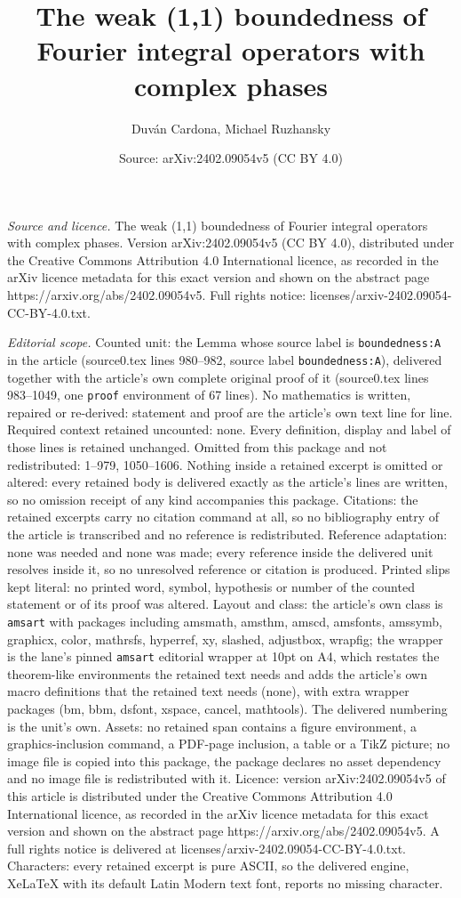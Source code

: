 \documentclass[10pt,a4paper]{amsart}
\title[The weak (1,1) boundedness of Fourier integral operators wit]{The weak (1,1) boundedness of Fourier integral operators with complex phases}
\author{Duv\'an Cardona, Michael Ruzhansky}
\date{Source: arXiv:2402.09054v5 (CC BY 4.0)}
\begin{document}
\maketitle

\noindent\emph{Source and licence.} The weak (1,1) boundedness of Fourier integral operators with complex phases. Version arXiv:2402.09054v5 (CC BY 4.0), distributed under the Creative Commons Attribution 4.0 International licence, as recorded in the arXiv licence metadata for this exact version and shown on the abstract page https://arxiv.org/abs/2402.09054v5. Full rights notice: licenses/arxiv-2402.09054-CC-BY-4.0.txt.\par\smallskip

\noindent\textit{Editorial scope.} Counted unit: the Lemma whose source label is \texttt{boundedness:A} in the article (source0.tex lines 980--982, source label \texttt{boundedness:A}), delivered together with the article's own complete original proof of it (source0.tex lines 983--1049, one \texttt{proof} environment of 67 lines). No mathematics is written, repaired or re-derived: statement and proof are the article's own text line for line. Required context retained uncounted: none. Every definition, display and label of those lines is retained unchanged. Omitted from this package and not redistributed: 1--979, 1050--1606. Nothing inside a retained excerpt is omitted or altered: every retained body is delivered exactly as the article's lines are written, so no omission receipt of any kind accompanies this package. Citations: the retained excerpts carry no citation command at all, so no bibliography entry of the article is transcribed and no reference is redistributed. Reference adaptation: none was needed and none was made; every reference inside the delivered unit resolves inside it, so no unresolved reference or citation is produced. Printed slips kept literal: no printed word, symbol, hypothesis or number of the counted statement or of its proof was altered. Layout and class: the article's own class is \texttt{amsart} with packages including amsmath, amsthm, amscd, amsfonts, amssymb, graphicx, color, mathrsfs, hyperref, xy, slashed, adjustbox, wrapfig; the wrapper is the lane's pinned \texttt{amsart} editorial wrapper at 10pt on A4, which restates the theorem-like environments the retained text needs and adds the article's own macro definitions that the retained text needs (none), with extra wrapper packages (bm, bbm, dsfont, xspace, cancel, mathtools). The delivered numbering is the unit's own. Assets: no retained span contains a figure environment, a graphics-inclusion command, a PDF-page inclusion, a table or a TikZ picture; no image file is copied into this package, the package declares no asset dependency and no image file is redistributed with it. Licence: version arXiv:2402.09054v5 of this article is distributed under the Creative Commons Attribution 4.0 International licence, as recorded in the arXiv licence metadata for this exact version and shown on the abstract page https://arxiv.org/abs/2402.09054v5. A full rights notice is delivered at licenses/arxiv-2402.09054-CC-BY-4.0.txt. Characters: every retained excerpt is pure ASCII, so the delivered engine, XeLaTeX with its default Latin Modern text font, reports no missing character.
\end{document}
